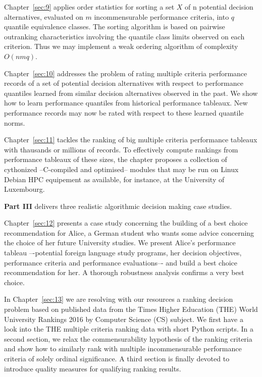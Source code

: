 Chapter~\ref{sec:9} applies order statistics for sorting a set $X$ of n potential decision alternatives, evaluated on $m$ incommensurable performance criteria, into $q$ quantile equivalence classes. The sorting algorithm is based on pairwise outranking characteristics involving the quantile class limits observed on each criterion. Thus we may implement a weak ordering algorithm of complexity $O(nmq)$.

Chapter~\ref{sec:10} addresses the problem of rating multiple criteria performance records of a set of potential decision alternatives with respect to performance quantiles learned from similar decision alternatives observed in the past. We show how to learn performance quantiles from historical performance tableaux. New performance records may now be rated with respect to these learned quantile norms.

Chapter~\ref{sec:11} tackles the ranking of big multiple criteria performance tableaux with thausands or millions of records. To effectively compute rankings from performance tableaux of these sizes, the chapter proposes a collection of cythonized --C-compiled and optimised-- modules that may be run on Linux Debian HPC equipement as available, for instance, at the University of Luxembourg.
\vspace{5pt}

\textbf{Part III} delivers three realistic algorithmic decision making case studies.

Chapter~\ref{sec:12} presents a case study concerning the building of a best choice recommendation for Alice, a German student who wants some advice concerning the choice of her future University studies. We present Alice’s performance tableau –-potential foreign language study programs, her decision objectives, performance criteria and performance evaluations–- and build a best choice recommendation for her. A thorough robustness analysis confirms a very best choice.

In Chapter~\ref{sec:13} we are resolving with our \Digraph resources a ranking decision problem based on published data from the Times Higher Education (THE) World University Rankings 2016 by Computer Science (CS) subject. We first have a look into the THE multiple criteria ranking data with short Python scripts. In a second section, we relax the commensurability hypothesis of the ranking criteria and show how to similarly rank with multiple incommensurable performance criteria of solely ordinal significance. A third section is finally devoted to introduce quality measures for qualifying ranking results.

